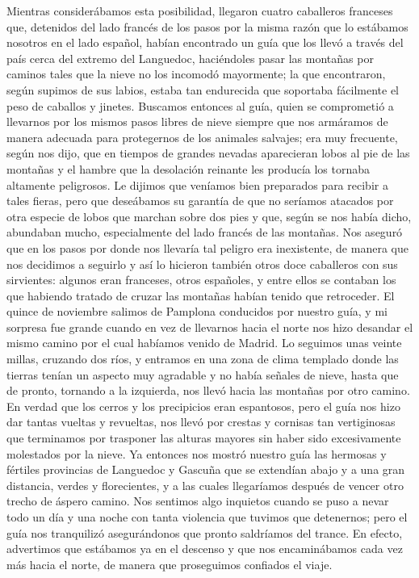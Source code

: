 \documentclass{novela}
\begin{document}
    Mientras considerábamos esta posibilidad, llegaron cuatro caballeros franceses que, detenidos del lado francés de los pasos por la misma razón que lo estábamos nosotros en el lado español, habían encontrado un guía que los llevó a través del país cerca del extremo del Languedoc, haciéndoles pasar las montañas por caminos tales que la nieve no los incomodó mayormente; la que encontraron, según supimos de sus labios, estaba tan endurecida que soportaba fácilmente el peso de caballos y jinetes.
    Buscamos entonces al guía, quien se comprometió a llevarnos por los mismos pasos libres de nieve siempre que nos armáramos de manera adecuada para protegernos de los animales salvajes; era muy frecuente, según nos dijo, que en tiempos de grandes nevadas aparecieran lobos al pie de las montañas y el hambre que la desolación reinante les producía los tornaba altamente peligrosos.
    Le dijimos que veníamos bien preparados para recibir a tales fieras, pero que deseábamos su garantía de que no seríamos atacados por otra especie de lobos que marchan sobre dos pies y que, según se nos había dicho, abundaban mucho, especialmente del lado francés de las montañas.
    Nos aseguró que en los pasos por donde nos llevaría tal peligro era inexistente, de manera que nos decidimos a seguirlo y así lo hicieron también otros doce caballeros con sus sirvientes: algunos eran franceses, otros españoles, y entre ellos se contaban los que habiendo tratado de cruzar las montañas habían tenido que retroceder.
    El quince de noviembre salimos de Pamplona conducidos por nuestro guía, y mi sorpresa fue grande cuando en vez de llevarnos hacia el norte nos hizo desandar el mismo camino por el cual habíamos venido de Madrid. Lo seguimos unas veinte millas, cruzando dos ríos, y entramos en una zona de clima templado donde las tierras tenían un aspecto muy agradable y no había señales de nieve, hasta que de pronto, tornando a la izquierda, nos llevó hacia las montañas por otro camino.
    En verdad que los cerros y los precipicios eran espantosos, pero el guía nos hizo dar tantas vueltas y revueltas, nos llevó por crestas y cornisas tan vertiginosas que terminamos por trasponer las alturas mayores sin haber sido excesivamente molestados por la nieve. Ya entonces nos mostró nuestro guía las hermosas y fértiles provincias de Languedoc y Gascuña que se extendían abajo y a una gran distancia, verdes y florecientes, y a las cuales llegaríamos después de vencer otro trecho de áspero camino.
    Nos sentimos algo inquietos cuando se puso a nevar todo un día y una noche con tanta violencia que tuvimos que detenernos; pero el guía nos tranquilizó asegurándonos que pronto saldríamos del trance. En efecto, advertimos que estábamos ya en el descenso y que nos encaminábamos cada vez más hacia el norte, de manera que proseguimos confiados el viaje.
\end{document}
